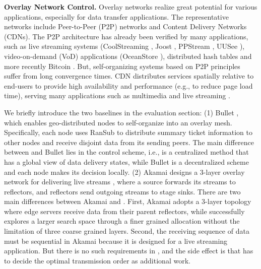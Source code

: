 \textbf{Overlay Network Control.}
Overlay networks realize great potential for various applications, especially for data transfer applications. The representative networks include Peer-to-Peer (P2P) networks and Content Delivery Networks (CDNs). The P2P architecture has already been verified by many applications, such as live streaming systems (CoolStreaming \cite{zhang2005coolstreaming}, Joost \cite{Joost}, PPStream \cite{PPStream}, UUSee \cite{UUSee}), video-on-demand (VoD) applications (OceanStore \cite{oceanstore}), distributed hash tables \cite{rhea2005opendht} and more recently Bitcoin \cite{eyal2016bitcoin}. But, self-organizing systems based on P2P principles suffer from long convergence times. CDN distributes services spatially relative to end-users to provide high availability and performance (e.g., to reduce page load time), serving many applications such as multimedia \cite{zhu2011multimedia} and live streaming \cite{sripanidkulchai2004analysis}.

We briefly introduce the two baselines in the evaluation section: (1) Bullet \cite{kostic2003bullet}, which enables geo-distributed nodes to self-organize into an overlay mesh. Specifically, each node uses RanSub \cite{Rodriguez2003Using} to distribute summary ticket information to other nodes and receive disjoint data from its sending peers. The main difference between \name and Bullet lies in the control scheme, i.e., \name is a centralized method that has a global view of data delivery states, while Bullet is a decentralized scheme and each node makes its decision locally. (2) Akamai designs a 3-layer overlay network for delivering live streams \cite{Andreev2013Designing}, where a source forwards its streams to reflectors, and reflectors send outgoing streams to stage sinks. There are two main differences between Akamai and \name. First, Akamai adopts a 3-layer topology where edge servers receive data from their parent reflectors, while \name successfully explores a larger search space through a finer grained allocation without the limitation of three coarse grained layers. Second, the receiving sequence of data must be sequential in Akamai because it is designed for a live streaming application. But there is no such requirements in \name, and the side effect is that \name has to decide the optimal transmission order as additional work.


